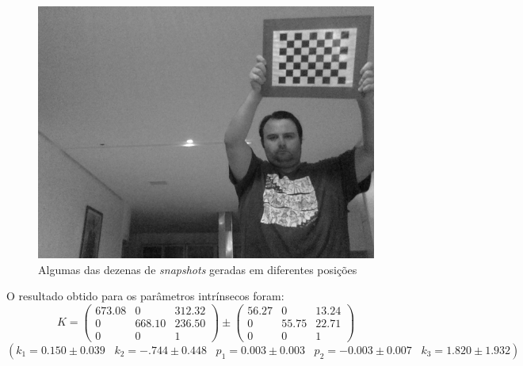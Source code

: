 \documentclass[conference]{IEEEtran}
\begin{document}
\begin{figure}[!htb]
\endminipage\hfill
{}%
  \includegraphics[width=\linewidth]{snap-6.png}
\endminipage\hfill
\caption{Algumas das dezenas de \textit{snapshots} geradas em diferentes posições}
\end{figure}
O resultado obtido para os parâmetros intrínsecos foram:
$$
K = \begin{pmatrix} 
673.08 & 0 & 312.32 \\
0 & 668.10 & 236.50\\
0 & 0 & 1
\end{pmatrix}
\pm
\begin{pmatrix} 
56.27 & 0 & 13.24 \\
0 & 55.75 & 22.71\\
0 & 0 & 1
\end{pmatrix}
$$
\((k_1=0.150\pm0.039 \hspace{10pt} k_2=-.744\pm0.448 \hspace{10pt} p_1=0.003\pm0.003 \hspace{10pt} p_2=-0.003\pm0.007 \hspace{10pt} k_3=1.820\pm1.932)\)
\end{document}
